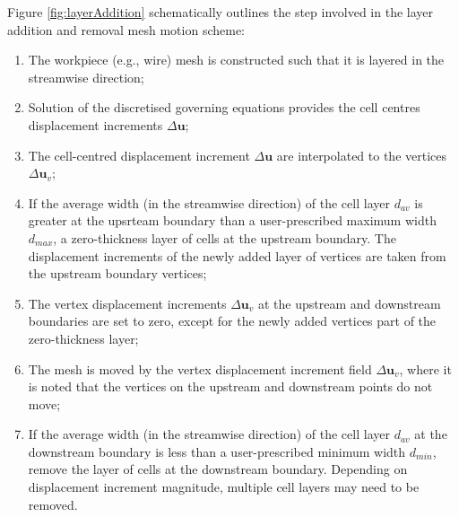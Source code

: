 \documentclass[sn-mathphys,Numbered,draft]{sn-jnl}%
\newcommand{\bb}{\boldsymbol}
\begin{document}
Figure \ref{fig:layerAddition} schematically outlines the step involved in the layer addition and removal mesh motion scheme:
\begin{enumerate}[label=(\alph*)]
	\item The workpiece (e.g., wire) mesh is constructed such that it is layered in the streamwise direction;
	\item Solution of the discretised governing equations provides the cell centres displacement increments $\Delta \bb{u}$;
	\item The cell-centred displacement increment $\Delta \bb{u}$ are interpolated to the vertices $\Delta \bb{u}_v$;
	\item If the average width (in the streamwise direction) of the cell layer $d_{av}$ is greater at the upsrteam boundary than a user-prescribed maximum width $d_{max}$, a zero-thickness layer of cells at the upstream boundary. The displacement increments of the newly added layer of vertices are taken from the upstream boundary vertices;
	\item The vertex displacement increments $\Delta \bb{u}_v$ at the upstream and downstream boundaries are set to zero, except for the newly added vertices part of the zero-thickness layer;
	\item The mesh is moved by the vertex displacement increment field $\Delta \bb{u}_v$, where it is noted that the vertices on the upstream and downstream points do not move;
	\item If the average width (in the streamwise direction) of the cell layer $d_{av}$ at the downstream boundary is less than a user-prescribed minimum width $d_{min}$, remove the layer of cells at the downstream boundary. Depending on displacement increment magnitude, multiple cell layers may need to be removed.
\end{enumerate}
\end{document}
